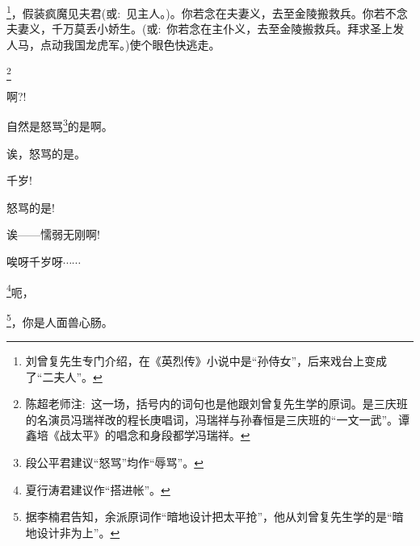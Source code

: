 {

\footnote{刘曾复先生专门介绍，在《英烈传》小说中是``孙侍女''，后来戏台上变成了``二夫人''。}{，假装疯魔见夫君({\akai 或}:~见主人。)。你若念在夫妻义，去至金陵搬救兵。你若不念夫妻义，千万莫丢小娇生。({\akai 或}:~你若念在主仆义，去至金陵搬救兵。拜求圣上发人马，点动我国龙虎军。)使个眼色快逃走。}

\footnote{陈超老师注:~这一场，括号内的词句也是他跟刘曾复先生学的原词。是三庆班的名演员冯瑞祥改的程长庚唱词，冯瑞祥与孙春恒是三庆班的``一文一武''。谭鑫培《战太平》的唱念和身段都学冯瑞祥。}

{\vspace{5pt}}


{啊?!}\hspace{40pt}~

{自然是怒骂}\footnote{段公平君建议``怒骂''均作``辱骂''。}{的是啊。}

{诶，怒骂的是。}\hspace{20pt}~

{千岁!}\hspace{40pt}~


{怒骂的是!}\hspace{30pt}~

{诶------懦弱无刚啊!}


{唉呀千岁呀$\cdots{}\cdots{}$}


\footnote{夏行涛君建议作``搭进帐''。}{呃，}

\footnote{据李楠君告知，余派原词作``暗地设计把太平抢''，他从刘曾复先生学的是``暗地设计非为上''。}{，你是人面兽心肠。}

}
